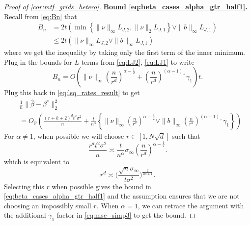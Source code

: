 \documentclass[ejs,noshowframe]{imsart}
\theoremstyle{plain}
\theoremstyle{definition}
\renewcommand{\P}{\mathbb{P}}
\newcommand{\snorm}[1]{\lVert #1 \rVert}
\renewcommand{\hat}{\widehat}
\begin{document}
\begin{appendix}
\begin{proof}[Proof of \autoref{cor:mtf_grids_hetero}]
	\textbf{Bound \eqref{eq:beta_cases_alpha_gtr_half1}.}
	Recall from \eqref{eq:Bn} that
	\begin{align*}
		B_n &= 2t\left( 
		\min\left\{ \|\nu\|_\infty  L_{J,2}, 
		\|\nu\|_2 L_{J,1} \right\}
		\vee  \| b \|_\infty L_{J,1}\right)\\
		&\leq 
		2t\left( \|\nu\|_\infty  L_{J,2} \vee \| b \|_\infty L_{J,1} \right) 
	\end{align*}
	where we get the inequality by taking only the 
	first 
	term of the inner minimum.
	Plug in the bounds for $L$ terms from \eqref{eq:LJ2}, \eqref{eq:LJ1} to write
	\begin{equation}
		B_n = O\left( \| \nu \|_\infty \left(\frac{n}{r^d}\right)^{\alpha - \frac 
		12} + \left(\frac{n}{r^d}\right)^{(\alpha - 1)_+} \gamma_1 \right) t.
	\end{equation}
Plug this back in \eqref{eq:lsq_rates_result} to get
	\begin{align}
		&\frac{1}{n}\snorm{ \hat\beta - \beta^* }_2^2 \label{eq:mse_simp3}\\
		& = O_\P \left( \frac{ (r+k+2)^d t^2  \sigma^2}{n} + 
		\frac{t}{n^\alpha}\left\{  \|\nu\|_\infty 
		\left(\frac{n}{r^d} \right)^{\alpha-\frac 12} 
		\lor \| b \|_\infty \left(\frac{n}{r^d} \right)^{(\alpha-1)_+} \gamma_1 
		\right\} \right) 
		\nonumber
	\end{align}
	For $\alpha \neq 1$, when possible we will choose $r \in [1, N\sqrt{d}]$ 
	such that
	\[
	\frac{r^d t^2  \sigma^2}{n} \asymp \frac{t}{n^\alpha} \sigma_\infty 
	\left(\frac{n}{r^d} 
	\right)^{\alpha-\frac 12}.
	\]
	which is equivalent to
	\[
	r^d \asymp \Big( \frac{\sqrt{n} \sigma_\infty}{t \sigma^2}  
	\Big)^{\frac{2}{2\alpha+1}}.
	\]
	Selecting this $r$ when possible gives the bound in 
	\eqref{eq:beta_cases_alpha_gtr_half1} and the assumption 
	 ensures that we 
	are not choosing an impossibly small $r$. When $\alpha = 1$, we can 
	retrace 
	the argument with the additional $\gamma_1$ factor in \eqref{eq:mse_simp3} to 
	get the bound.
	
	
	

\end{proof}
\end{appendix}
\end{document}
